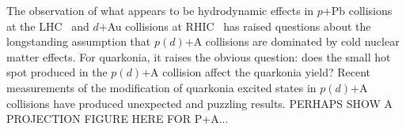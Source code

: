 The observation of what appears to be hydrodynamic effects in $p$$+$Pb
collisions at the
LHC~\cite{Abelev:2012ola,Aad:2013fja,Chatrchyan:2013nka} and $d$$+$Au
collisions at RHIC~\cite{Adare:2013piz} has raised questions about the
longstanding assumption that $p(d)$$+$A collisions are dominated by cold
nuclear matter effects. For quarkonia, it raises the obvious question:
does the small hot spot produced in the $p(d)$$+$A collision affect the
quarkonia yield?  Recent measurements of the modification of quarkonia excited states in
$p(d)$$+$A collisions have produced unexpected and puzzling
results.    PERHAPS SHOW A PROJECTION FIGURE HERE FOR P+A...




